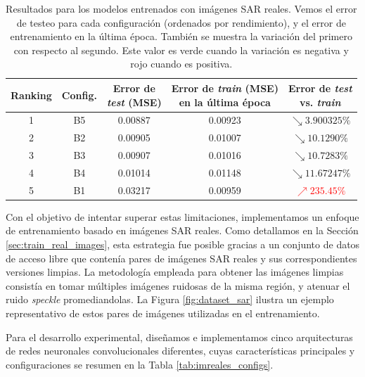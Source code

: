\begin{table}[htbp]
	\centering
	\caption{Resultados para los modelos entrenados con imágenes SAR reales. Vemos el error de testeo para cada configuración (ordenados por rendimiento), y el error de entrenamiento en la última época. También se muestra la variación del primero con respecto al segundo. Este valor es verde cuando la variación es negativa y rojo cuando es positiva.}
	\label{tab:testing_imreal_results}
	\small
	\begin{tabular}{|c|c|c|c|c|}
		\hline
		\textbf{Ranking} &
		\textbf{Config.} &
		\makecell{\textbf{Error de} \\ \textbf{\emph{test} (MSE)}} &
		\makecell{\textbf{Error de \emph{train} (MSE)} \\ \textbf{en la última época}} &
		\makecell{\textbf{Error de \emph{test}} \\ \textbf{vs. \emph{train}}} \\
		\hline
		1 & B5 & 0.00887 & 0.00923 & \textcolor{verdecito}{$\searrow 3.900325\%$} \\
		2 & B2 & 0.00905 & 0.01007 & \textcolor{verdecito}{$\searrow 10.1290\%$} \\
		3 & B3 & 0.00907 & 0.01016 & \textcolor{verdecito}{$\searrow 10.7283\%$} \\
		4 & B4 & 0.01014 & 0.01148 & \textcolor{verdecito}{$\searrow 11.67247\%$} \\
		5 & B1 & 0.03217 & 0.00959 & \textcolor{red}{$\nearrow 235.45\%$} \\
		\hline
	\end{tabular}
\end{table}

Con el objetivo de intentar superar estas limitaciones, implementamos un enfoque de entrenamiento basado en imágenes SAR reales. Como detallamos en la Sección \ref{sec:train_real_images}, esta estrategia fue posible gracias a un conjunto de datos de acceso libre que contenía pares de imágenes SAR reales y sus correspondientes versiones limpias. La metodología empleada para obtener las imágenes limpias consistía en tomar múltiples imágenes ruidosas de la misma región, y atenuar el ruido \emph{speckle} promediandolas. La Figura \ref{fig:dataset_sar} ilustra un ejemplo representativo de estos pares de imágenes utilizadas en el entrenamiento.

Para el desarrollo experimental, diseñamos e implementamos cinco arquitecturas de redes neuronales convolucionales diferentes, cuyas características principales y configuraciones se resumen en la Tabla \ref{tab:imreales_configs}.

